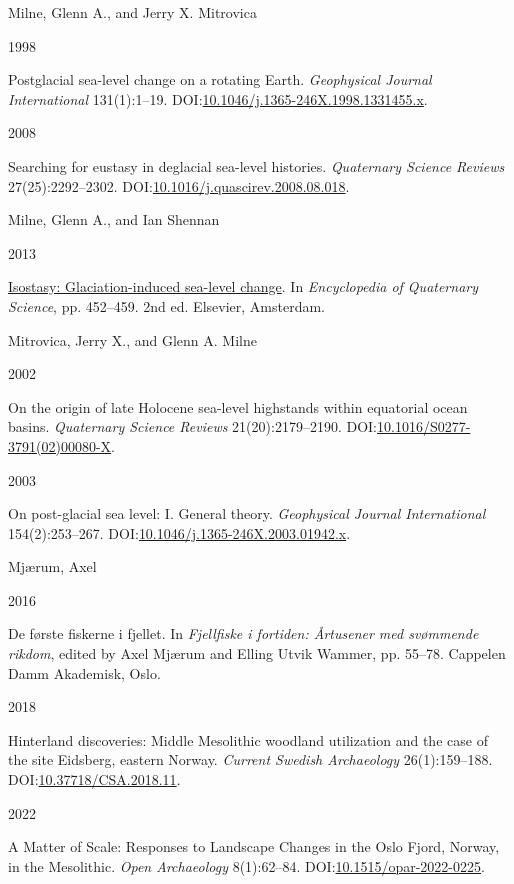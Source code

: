 \documentclass[
  12pt,
  a4paper,
  oneside]{book}
\newlength{\cslhangindent}
\newlength{\csllabelwidth}
\newlength{\cslentryspacingunit} %
\newenvironment{CSLReferences}[2] %
 {%
  \setlength{\parindent}{0pt}
  \ifodd #1
  \let\oldpar\par
  \def\par{\hangindent=\cslhangindent\oldpar}
  \fi
  \setlength{\parskip}{#2\cslentryspacingunit}
 }%
 {}
\newcommand{\CSLBlock}[1]{#1\hfill\break}
\newcommand{\CSLLeftMargin}[1]{\parbox[t]{\csllabelwidth}{#1}}
\newcommand{\CSLRightInline}[1]{\parbox[t]{\linewidth - \csllabelwidth}{#1}\break}
\begin{document}
\begin{CSLReferences}{0}{0}
\leavevmode{}%
\CSLBlock{Milne, Glenn A., and Jerry X. Mitrovica}
\CSLLeftMargin{ 1998}
\CSLRightInline{Postglacial sea-level change on a rotating Earth. \emph{Geophysical Journal International} 131(1):1--19. DOI:\href{https://doi.org/10.1046/j.1365-246X.1998.1331455.x}{10.1046/j.1365-246X.1998.1331455.x}.}

\leavevmode{}%
\CSLLeftMargin{ 2008 }
\CSLRightInline{Searching for eustasy in deglacial sea-level histories. \emph{Quaternary Science Reviews} 27(25):2292--2302. DOI:\href{https://doi.org/10.1016/j.quascirev.2008.08.018}{10.1016/j.quascirev.2008.08.018}.}

\leavevmode{}%
\CSLBlock{Milne, Glenn A., and Ian Shennan}
\CSLLeftMargin{ 2013}
\CSLRightInline{\href{https://doi.org/10.1016/B978-0-444-53643-3.00135-7}{Isostasy: Glaciation-induced sea-level change}. In \emph{{Encyclopedia of Quaternary Science}}, pp. 452--459. 2nd ed. Elsevier, Amsterdam.}

\leavevmode{}%
\CSLBlock{Mitrovica, Jerry X., and Glenn A. Milne}
\CSLLeftMargin{ 2002}
\CSLRightInline{{On the origin of late Holocene sea-level highstands within equatorial ocean basins}. \emph{Quaternary Science Reviews} 21(20):2179--2190. DOI:\href{https://doi.org/10.1016/S0277-3791(02)00080-X}{10.1016/S0277-3791(02)00080-X}.}

\leavevmode{}%
\CSLLeftMargin{ 2003 }
\CSLRightInline{{On post-glacial sea level: I. General theory}. \emph{Geophysical Journal International} 154(2):253--267. DOI:\href{https://doi.org/10.1046/j.1365-246X.2003.01942.x}{10.1046/j.1365-246X.2003.01942.x}.}

\leavevmode{}%
\CSLBlock{Mjærum, Axel}
\CSLLeftMargin{ 2016}
\CSLRightInline{{De første fiskerne i fjellet}. In \emph{{Fjellfiske i fortiden: Årtusener med svømmende rikdom}}, edited by Axel Mjærum and Elling Utvik Wammer, pp. 55--78. Cappelen Damm Akademisk, Oslo.}

\leavevmode{}%
\CSLLeftMargin{ 2018 }
\CSLRightInline{Hinterland discoveries: Middle Mesolithic woodland utilization and the case of the site Eidsberg, eastern Norway. \emph{Current Swedish Archaeology} 26(1):159--188. DOI:\href{https://doi.org/10.37718/CSA.2018.11}{10.37718/CSA.2018.11}.}

\leavevmode{}%
\CSLLeftMargin{ 2022 }
\CSLRightInline{{A Matter of Scale: Responses to Landscape Changes in the Oslo Fjord, Norway, in the Mesolithic}. \emph{Open Archaeology} 8(1):62--84. DOI:\href{https://doi.org/10.1515/opar-2022-0225}{10.1515/opar-2022-0225}.}


\end{CSLReferences}
\end{document}
